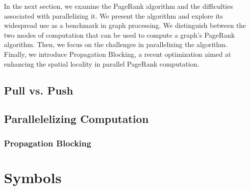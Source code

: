In the next section, we examine the PageRank algorithm and the difficulties associated with parallelizing it. We present the algorithm and explore its widespread use as a benchmark in graph processing. We distinguish between the two modes of computation that can be used to compute a graph's PageRank algorithm. Then, we focus on the challenges in parallelizing the algorithm. Finally, we introduce Propagation Blocking, a recent optimization aimed at enhancing the spatial locality in parallel PageRank computation.
\subsection{Pull vs. Push}
\subsection{Parallelelizing Computation}
\par{
}
\subsubsection{Propagation Blocking}
\section{Symbols}
